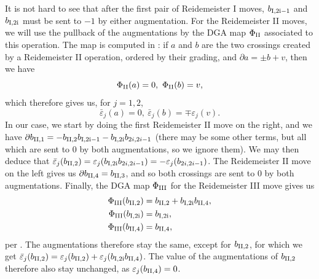 \documentclass[11pt]{amsart}
\theoremstyle{plain}
\theoremstyle{remark}
\numberwithin{equation}{section}
\begin{document}
It is not hard to see that after the first pair of Reidemeister I moves, $b_{\rm I,2i-1}$ and $b_{\rm I,2i}$ must be sent to $-1$ by either augmentation. 
For the Reidemeister II moves, we will use the pullback of the augmentations by the DGA map $\Phi_{\rm II}$ associated to this operation. The map is computed in \cite[section 6.3.3.]{EKK}: if $a$ and $b$ are the two crossings created by a Reidemeister II operation, ordered by their grading, and $\partial a = \pm b+v$, then we have \begin{equation} \Phi_{\rm II}(a)=0,\ \Phi_{\rm II}(b)=v,\end{equation} which therefore gives us, for $j=1,2$, \begin{equation}\label{eq:augmentations_reidemeister_II}\bar\varepsilon_j(a)=0, \ \bar\varepsilon_j(b)=\mp \varepsilon_j(v).\end{equation} In our case, we start by doing the first Reidemeister II move on the right, and we have $\partial b_{\rm II,1}=-b_{\rm II,2}b_{\rm I,2i-1}-b_{\rm I,2i}b_{2i,2i-1}$ (there may be some other terms, but all which are sent to 0 by both augmentations, so we ignore them). We may then deduce that $\bar\varepsilon_j(b_{\rm II,2})=\varepsilon_j(b_{\rm I,2i}b_{2i,2i-1})=-\varepsilon_j(b_{2i,2i-1})$. The Reidemeister II move on the left gives us $\partial b_{\rm II,4}=b_{\rm II,3}$, and so both crossings are sent to 0 by both augmentations.
Finally, the DGA map $\Phi_{\rm III}$ for the Reidemeister III move gives us 
\begin{equation}\label{eq:reidemeister_III}\begin{aligned} \Phi_{\rm III}(b_{\rm II,2})&=b_{\rm II,2}+b_{\rm I,2i}b_{\rm II,4},\\ \Phi_{\rm III}(b_{\rm I,2i})&=b_{\rm I,2i},\\ \Phi_{\rm III}(b_{\rm II,4})&=b_{\rm II,4},\end{aligned}\end{equation} per \cite[section 6.3.2.]{EKK}.  The augmentations therefore stay the same, except for $b_{\rm II,2}$, for which we get $\bar\varepsilon_j(b_{\rm II,2})=\varepsilon_j(b_{\rm II,2})+\varepsilon_j(b_{\rm I,2i}b_{\rm II,4})$. The value of the augmentations of $b_{\rm II,2}$ therefore also stay unchanged, as $\varepsilon_j(b_{\rm II,4})=0$. 
\end{document}
